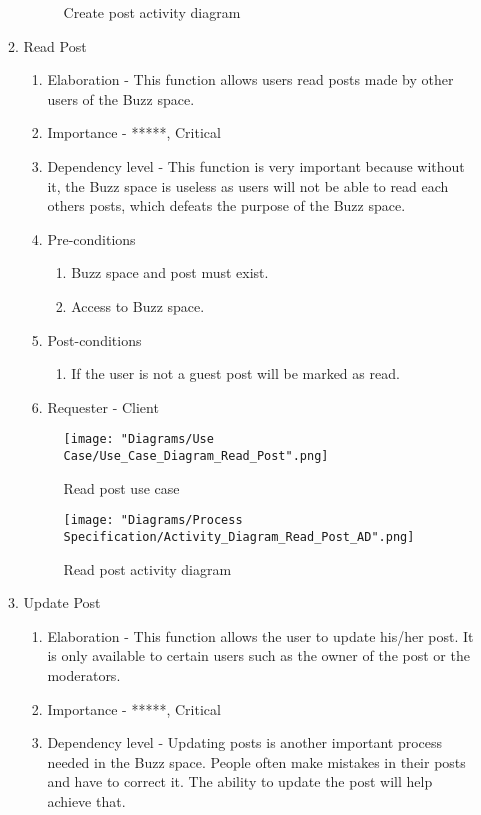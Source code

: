 \documentclass[12pt]{article}
\begin{document}
\begin{enumerate}
\begin{enumerate}
\begin{figure}[h]
  		\caption{Create post activity diagram}
  	\end{figure}
  	\clearpage
  	\newpage
  		\item Read Post
  		\begin{enumerate}
  			\item Elaboration - This function allows users read posts made by other users of the Buzz space.
   	 		\item Importance - *****, Critical
   	 		\item Dependency level - This function is very important because without it, the Buzz space is useless as users will not be able to read each others posts, which defeats the purpose of the Buzz space.
   	 		\item Pre-conditions
   			\begin{enumerate}
    			\item Buzz space and post must exist.
    			\item Access to Buzz space.
    		\end{enumerate}
     		\item Post-conditions
    		\begin{enumerate}
  	  			\item If the user is not a guest post will be marked as read.
   	 		\end{enumerate}
   	 		\item Requester - Client
  		\end{enumerate}
  	\begin{figure}[h]
  		\centering
  		\texttt{[image: "Diagrams/Use Case/Use\_Case\_Diagram\_Read\_Post".png]}
  		\caption{Read post use case}
  	\end{figure}
  	\begin{figure}[h]
  		\centering
  		\texttt{[image: "Diagrams/Process Specification/Activity\_Diagram\_Read\_Post\_AD".png]}
  		\caption{Read post activity diagram}
  	\end{figure}
  	\newpage
  	\clearpage
  		\item Update Post
  		\begin{enumerate}
  			\item Elaboration - This function allows the user to update his/her post. It is only available to certain users such as the owner of the post or the moderators.
   	 		\item Importance - *****, Critical
   	 		\item Dependency level - Updating posts is another important process needed in the Buzz space. People often make mistakes in their posts and have to correct it. The ability to update the post will help achieve that.

\end{enumerate}
\end{enumerate}
\end{enumerate}
\end{document}
